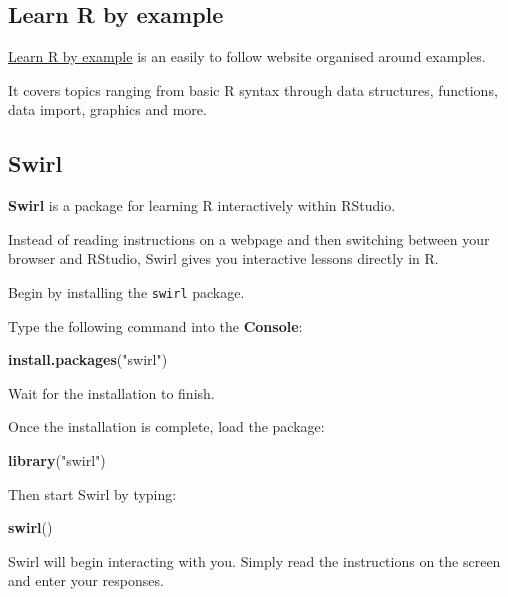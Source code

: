 \documentclass[
]{book}
\newenvironment{Shaded}{\begin{snugshade}}{\end{snugshade}}
\newcommand{\FunctionTok}[1]{\textcolor[rgb]{0.13,0.29,0.53}{\textbf{#1}}}
\newcommand{\NormalTok}[1]{#1}
\newcommand{\StringTok}[1]{\textcolor[rgb]{0.31,0.60,0.02}{#1}}
\begin{document}
\subsection{Learn R by example}\label{learn-r-by-example}

\href{https://www.learnbyexample.org/r/}{Learn R by example} is an easily to follow website organised around examples.

It covers topics ranging from basic R syntax through data structures, functions, data import, graphics and more.

\subsection{Swirl}\label{swirl}

\textbf{Swirl} is a package for learning R interactively within RStudio.

Instead of reading instructions on a webpage and then switching between your browser and RStudio, Swirl gives you interactive lessons directly in R.

Begin by installing the \texttt{swirl} package.

Type the following command into the \textbf{Console}:

\begin{Shaded}
\begin{Highlighting}[]
\FunctionTok{install.packages}\NormalTok{(}\StringTok{"swirl"}\NormalTok{)}
\end{Highlighting}
\end{Shaded}

Wait for the installation to finish.

Once the installation is complete, load the package:

\begin{Shaded}
\begin{Highlighting}[]
\FunctionTok{library}\NormalTok{(}\StringTok{"swirl"}\NormalTok{)}
\end{Highlighting}
\end{Shaded}

Then start Swirl by typing:

\begin{Shaded}
\begin{Highlighting}[]
\FunctionTok{swirl}\NormalTok{()}
\end{Highlighting}
\end{Shaded}

Swirl will begin interacting with you. Simply read the instructions on the screen and enter your responses.
\end{document}
